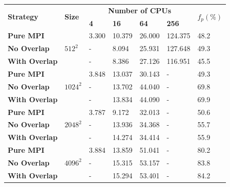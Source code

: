 \begin{frame}
  \begin{center}
    \label{TAB:Benchmark:Weak_PURE_MPI_Multi_Node}
    \footnotesize
    \begin{tabular}{p{3cm} p{1.5cm} p{1.5cm} p{1.5cm} p{1.5cm} p{1.5cm} p{1cm}}
      \toprule
      \multirow{2}{*}{\bfseries Strategy}     & \multirow{2}{*}{\bfseries Size} & \multicolumn{4}{c}{\bfseries  Number of CPUs}   & \multirow{2}{*}{\bfseries $f_p(\%)$}  \\
                                    &                                 & \bfseries 4   & \bfseries 16   & \bfseries 64  & \bfseries 256  &                        \\
      \midrule
      \bfseries Pure MPI      & \multirow{3}{*}{$512^2$}      & 3.300  & 10.379  & 26.000   & 124.375                                    & 48.2 \\
      \bfseries No Overlap    &                               &   -    &  8.094  & 25.931   & 127.648                                    & 49.3 \\
      \bfseries With Overlap  &                               &   -    &  8.386  & 27.126   & 116.951                                    & 45.5 \\
      \midrule
      \bfseries Pure MPI      & \multirow{3}{*}{$1024^2$}     & 3.848  & 13.037  & 30.143   &   -                                        & 49.3 \\
      \bfseries No Overlap    &                               &   -    & 13.702  & 44.040   &   -                                        & 69.8 \\
      \bfseries With Overlap  &                               &   -    & 13.834  & 44.090   &   -                                        & 69.9 \\
      \midrule
      \bfseries Pure MPI      & \multirow{3}{*}{$2048^2$}     & 3.787  & 9.172   & 32.013   &   -                                        & 50.6 \\
      \bfseries No Overlap    &                               &   -    & 13.936  & 34.368   &   -                                        & 55.7 \\
      \bfseries With Overlap  &                               &   -    & 14.274  & 34.414   &   -                                        & 55.9 \\
      \midrule
      \bfseries Pure MPI      & \multirow{3}{*}{$4096^2$}     & 3.884  & 13.859  & 51.041   &   -                                        & 80.2 \\
      \bfseries No Overlap    &                               &   -    & 15.315  & 53.157   &   -                                        & 83.8 \\
      \bfseries With Overlap  &                               &   -    & 15.294  & 53.401   &   -                                        & 84.2 \\
      \bottomrule
    \end{tabular}
  \end{center}
\end{frame}


